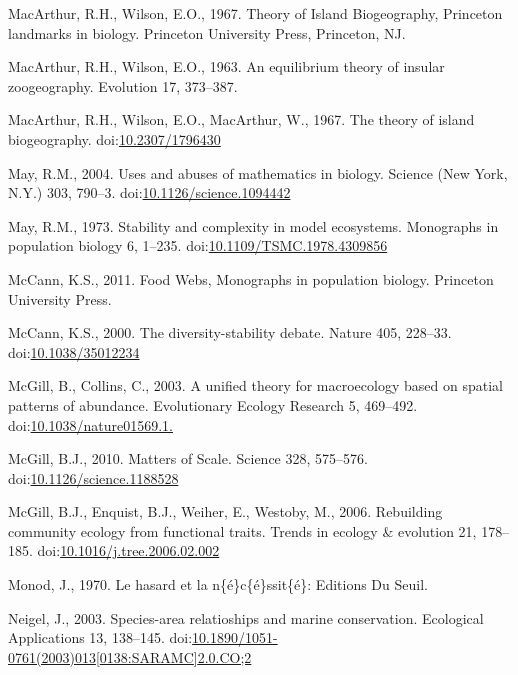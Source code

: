 \hypertarget{ref-MacArthur1967}{}
MacArthur, R.H., Wilson, E.O., 1967. Theory of Island Biogeography,
Princeton landmarks in biology. Princeton University Press, Princeton,
NJ.

\hypertarget{ref-MacArthur1963}{}
MacArthur, R.H., Wilson, E.O., 1963. An equilibrium theory of insular
zoogeography. Evolution 17, 373--387.

\hypertarget{ref-MacArthur1967a}{}
MacArthur, R.H., Wilson, E.O., MacArthur, W., 1967. The theory of island
biogeography.
doi:\href{https://doi.org/10.2307/1796430}{10.2307/1796430}

\hypertarget{ref-May2004}{}
May, R.M., 2004. Uses and abuses of mathematics in biology. Science (New
York, N.Y.) 303, 790--3.
doi:\href{https://doi.org/10.1126/science.1094442}{10.1126/science.1094442}

\hypertarget{ref-May1973}{}
May, R.M., 1973. Stability and complexity in model ecosystems.
Monographs in population biology 6, 1--235.
doi:\href{https://doi.org/10.1109/TSMC.1978.4309856}{10.1109/TSMC.1978.4309856}

\hypertarget{ref-mccann2011food}{}
McCann, K.S., 2011. Food Webs, Monographs in population biology.
Princeton University Press.

\hypertarget{ref-McCann2000}{}
McCann, K.S., 2000. The diversity-stability debate. Nature 405, 228--33.
doi:\href{https://doi.org/10.1038/35012234}{10.1038/35012234}

\hypertarget{ref-McGill2003}{}
McGill, B., Collins, C., 2003. A unified theory for macroecology based
on spatial patterns of abundance. Evolutionary Ecology Research 5,
469--492.
doi:\href{https://doi.org/10.1038/nature01569.1.}{10.1038/nature01569.1.}

\hypertarget{ref-McGill2010}{}
McGill, B.J., 2010. Matters of Scale. Science 328, 575--576.
doi:\href{https://doi.org/10.1126/science.1188528}{10.1126/science.1188528}

\hypertarget{ref-McGill2006}{}
McGill, B.J., Enquist, B.J., Weiher, E., Westoby, M., 2006. Rebuilding
community ecology from functional traits. Trends in ecology \& evolution
21, 178--185.
doi:\href{https://doi.org/10.1016/j.tree.2006.02.002}{10.1016/j.tree.2006.02.002}

\hypertarget{ref-monod1970hasard}{}
Monod, J., 1970. Le hasard et la n\{é\}c\{é\}ssit\{é\}: Editions Du
Seuil.

\hypertarget{ref-Neigel2003}{}
Neigel, J., 2003. Species-area relatioships and marine conservation.
Ecological Applications 13, 138--145.
doi:\href{https://doi.org/10.1890/1051-0761(2003)013\%5B0138:SARAMC\%5D2.0.CO;2}{10.1890/1051-0761(2003)013{[}0138:SARAMC{]}2.0.CO;2}

